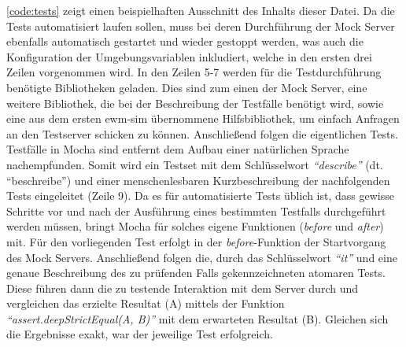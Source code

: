 \autoref{code:tests} zeigt einen beispielhaften Ausschnitt des Inhalts dieser Datei.
Da die Tests automatisiert laufen sollen, muss bei deren Durchführung der Mock Server ebenfalls automatisch gestartet und wieder gestoppt werden, was auch die Konfiguration der Umgebungsvariablen inkludiert, welche in den ersten drei Zeilen vorgenommen wird.
In den Zeilen 5-7 werden für die Testdurchführung benötigte Bibliotheken geladen.
Dies sind zum einen der Mock Server, eine weitere Bibliothek, die bei der Beschreibung der Testfälle benötigt wird, sowie eine aus dem ersten \ac{ewm-sim} übernommene Hilfsbibliothek, um einfach Anfragen an den Testserver schicken zu können.
Anschließend folgen die eigentlichen Tests.
Testfälle in Mocha sind entfernt dem Aufbau einer natürlichen Sprache nachempfunden.
Somit wird ein Testset mit dem Schlüsselwort \emph{\enquote{describe}} (dt. \enquote{beschreibe}) und einer menschenlesbaren Kurzbeschreibung der nachfolgenden Tests eingeleitet (Zeile 9).
Da es für automatisierte Tests üblich ist, dass gewisse Schritte vor und nach der Ausführung eines bestimmten Testfalls durchgeführt werden müssen, bringt Mocha für solches eigene Funktionen (\emph{before} und \emph{after}) mit.
Für den vorliegenden Test erfolgt in der \emph{before}-Funktion der Startvorgang des Mock Servers.
Anschließend folgen die, durch das Schlüsselwort \emph{\enquote{it}} und eine genaue Beschreibung des zu prüfenden Falls gekennzeichneten atomaren Tests.
Diese führen dann die zu testende Interaktion mit dem Server durch und vergleichen das erzielte Resultat (A) mittels der Funktion \emph{\enquote{assert.deepStrictEqual(A, B)}} mit dem erwarteten Resultat (B).
Gleichen sich die Ergebnisse exakt, war der jeweilige Test erfolgreich.




